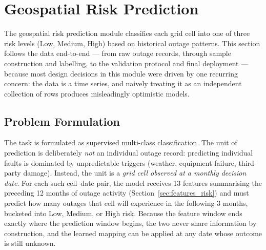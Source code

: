 
\section{Geospatial Risk Prediction}
\label{sec:risk_prediction}

The geospatial risk prediction module classifies each grid cell into one of three risk levels (Low, Medium, High) based on historical outage patterns. This section follows the data end-to-end --- from raw outage records, through sample construction and labelling, to the validation protocol and final deployment --- because most design decisions in this module were driven by one recurring concern: the data is a time series, and naively treating it as an independent collection of rows produces misleadingly optimistic models.

\subsection{Problem Formulation}

The task is formulated as supervised multi-class classification. The unit of prediction is deliberately \emph{not} an individual outage record: predicting individual faults is dominated by unpredictable triggers (weather, equipment failure, third-party damage). Instead, the unit is a \emph{grid cell observed at a monthly decision date}. For each such cell--date pair, the model receives 13 features summarising the preceding 12 months of outage activity (Section~\ref{sec:features_risk}) and must predict how many outages that cell will experience in the following 3 months, bucketed into Low, Medium, or High risk. Because the feature window ends exactly where the prediction window begins, the two never share information by construction, and the learned mapping can be applied at any date whose outcome is still unknown.

